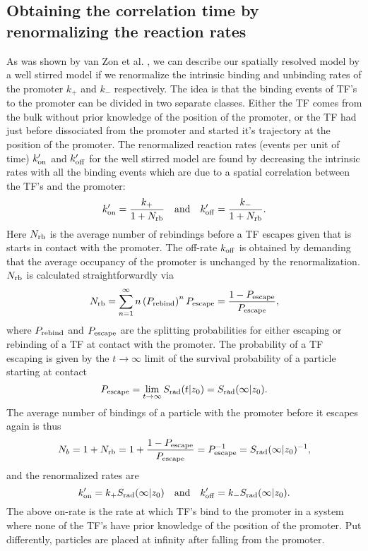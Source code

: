\subsection{Obtaining the correlation time by renormalizing the reaction rates}
As was shown by van Zon et al. \cite{VanZon2006}, we can describe our spatially resolved model by a well stirred model if we renormalize the intrinsic binding and unbinding rates of the promoter $k_+$ and $k_-$ respectively. The idea is that the binding events of TF's to the promoter can be divided in two separate classes. Either the TF comes from the bulk without prior knowledge of the position of the promoter, or the TF had just before dissociated from the promoter and started it's trajectory at the position of the promoter. The renormalized reaction rates (events per unit of time) $k'_{\rm on}$ and $k'_{\rm off}$ for the well stirred model are found by decreasing the intrinsic rates with all the binding events which are due to a spatial correlation between the TF's and the promoter:
\begin{equation}
 k'_{\rm on} = \frac{k_+}{1 + N_{\rm rb}} \quad \text{and} \quad k'_{\rm off} = \frac{k_-}{1 + N_{\rm rb}}.
\end{equation}
Here $N_{\rm rb}$ is the average number of rebindings before a TF escapes given that is starts in contact with the promoter. The off-rate $k_{\rm off}$ is obtained by demanding that the average occupancy of the promoter is unchanged by the renormalization. $N_{\rm rb}$ is calculated straightforwardly via
\begin{equation}
 N_{\rm rb} = \sum_{n=1}^{\infty} n \left( P_{\rm rebind} \right)^n P_{\rm escape} = \frac{1-P_{\rm escape}}{P_{\rm escape}},
\end{equation}
where $P_{\rm rebind}$ and $P_{\rm escape}$ are the splitting probabilities for either escaping or rebinding of a TF at contact with the promoter. The probability of a TF escaping is given by the $t \to \infty$ limit of the survival probability of a particle starting at contact 
\begin{equation}
 P_{\rm escape} = \lim_{t \to \infty} S_{\rm rad}(t|z_0) = S_{\rm rad}(\infty|z_0).
\end{equation}
The average number of bindings of a particle with the promoter before it escapes again is thus
\begin{equation}
 N_b = 1 + N_{\rm rb} = 1 + \frac{1 - P_{\rm escape}}{P_{\rm escape}} = P_{\rm escape}^{-1} = S_{\rm rad}(\infty|z_0)^{-1},
\end{equation}
and the renormalized rates are
\begin{equation}
 k'_{\rm on} = k_+ S_{\rm rad}(\infty|z_0) \quad \text{and} \quad  k'_{\rm off} = k_- S_{\rm rad}(\infty|z_0).
 \elabel{RenRates}
\end{equation}
The above on-rate is the rate at which TF's bind to the promoter in a system where none of the TF's have prior knowledge of the position of the promoter. Put differently, particles are placed at infinity after falling from the promoter. 

